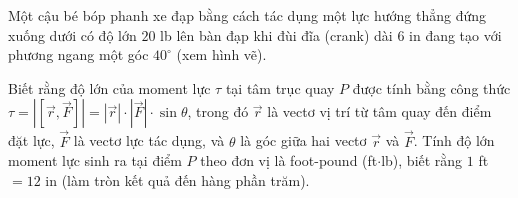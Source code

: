 \begin{ex}
Một cậu bé bóp phanh xe đạp bằng cách tác dụng một lực hướng thẳng đứng xuống dưới có độ lớn $20$ lb lên bàn đạp khi đùi đĩa (crank) dài $6$ in đang tạo với phương ngang một góc $40^\circ$ (xem hình vẽ).
\begin{center}
\end{center}
Biết rằng độ lớn của moment lực $\tau$ tại tâm trục quay $P$ được tính bằng công thức $\tau=\left|\left[\vec r,\vec F\right]\right|=|\vec r|\cdot|\vec F|\cdot\sin\theta$, trong đó $\vec r$ là vectơ vị trí từ tâm quay đến điểm đặt lực, $\vec F$ là vectơ lực tác dụng, và $\theta$ là góc giữa hai vectơ $\vec r$ và $\vec F$. Tính độ lớn moment lực sinh ra tại điểm $P$ theo đơn vị là foot-pound (ft$\cdot$lb), biết rằng $1$ ft $=12$ in (làm tròn kết quả đến hàng phần trăm).
\end{ex}
